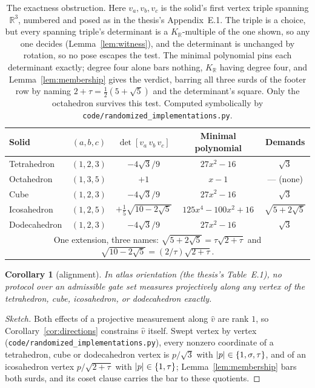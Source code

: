 \documentclass[11pt,a4paper]{article}
\newcommand{\R}{\mathbb{R}}
\newcommand{\phig}{\tau}      %
\newcommand{\invphig}{\sigma} %
\DeclarePairedDelimiter{\abs}{\lvert}{\rvert}
\newenvironment{sketch}{\renewcommand{\qedsymbol}{}\begin{proof}[Sketch]}{\end{proof}}
\newtheorem{corollary}[theorem]{Corollary}
\begin{document}
\begin{table}[H]\centering
\renewcommand{\arraystretch}{1.2}
\begin{tabular}{l c c c c}
\toprule
Solid & $(a,b,c)$ & $\det[v_a\,v_b\,v_c]$ & Minimal polynomial & Demands \\
\midrule
  Tetrahedron & $(1,2,3)$ & $-4\sqrt{3}/9$ & $27 x^{2} - 16$ & $\sqrt{3}$ \\
  Octahedron & $(1,3,5)$ & $+1$ & $x - 1$ & --- (none) \\
  Cube & $(1,2,3)$ & $-4\sqrt{3}/9$ & $27 x^{2} - 16$ & $\sqrt{3}$ \\
  Icosahedron & $(1,2,5)$ & $+\tfrac{1}{5}\sqrt{10-2\sqrt{5}}$ & $125 x^{4} - 100 x^{2} + 16$ & $\sqrt{5+2\sqrt{5}}$ \\
  Dodecahedron & $(1,2,3)$ & $-4\sqrt{3}/9$ & $27 x^{2} - 16$ & $\sqrt{3}$ \\
\midrule
\multicolumn{5}{c}{One extension, three names: $\sqrt{5+2\sqrt{5}} = \phig\sqrt{2+\phig}$ and $\sqrt{10-2\sqrt{5}} = (2/\phig)\sqrt{2+\phig}$.} \\
\bottomrule
\end{tabular}
\caption{The exactness obstruction. Here $v_a, v_b, v_c$ is the solid's first vertex triple spanning $\R^3$, numbered and posed as in the thesis's Appendix~E.1. The triple is a choice, but every spanning triple's determinant is a $K_\R$-multiple of the one shown, so any one decides (Lemma~\ref{lem:witness}), and the determinant is unchanged by rotation, so no pose escapes the test. The minimal polynomial pins each determinant exactly; degree four alone bars nothing, $K_\R$ having degree four, and Lemma~\ref{lem:membership} gives the verdict, barring all three surds of the footer row by naming $2+\phig = \tfrac{1}{2}(5+\sqrt{5})$ and the determinant's square. Only the octahedron survives this test. Computed symbolically by \texttt{code/randomized\_implementations.py}.}
\label{tab:povm-exactness}
\end{table}

\begin{corollary}[alignment] \label{cor:alignment}
In atlas orientation (the thesis's Table~E.1), no protocol over an admissible gate set measures projectively along any vertex of the tetrahedron, cube, icosahedron, or dodecahedron exactly.
\end{corollary}

\begin{sketch}
Both effects of a projective measurement along $\hat v$ are rank $1$, so Corollary~\ref{cor:directions} constrains $\hat v$ itself. Swept vertex by vertex (\texttt{code/randomized\_implementations.py}), every nonzero coordinate of a tetrahedron, cube or dodecahedron vertex is $p/\sqrt{3}$ with $\abs{p} \in \{1, \invphig, \phig\}$, and of an icosahedron vertex $p/\sqrt{2+\phig}$ with $\abs{p} \in \{1, \phig\}$; Lemma~\ref{lem:membership} bars both surds, and its coset clause carries the bar to these quotients.
\end{sketch}
\end{document}
